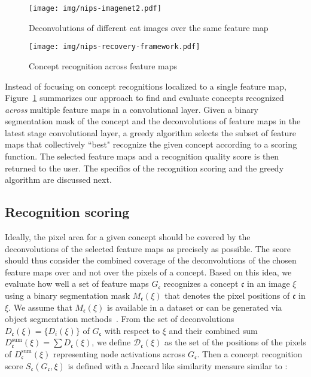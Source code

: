 \documentclass{article}
\begin{document}
\begin{figure}
\centering
\begin{minipage}{.42\textwidth}
  \centering
    \texttt{[image: img/nips-imagenet2.pdf]}
 \caption{Deconvolutions of different cat images over the same feature map}
  \label{fig:nips-imagenet2}
\end{minipage}%
\hspace{20px}
\begin{minipage}{.52\textwidth}
  \centering
  \texttt{[image: img/nips-recovery-framework.pdf]}
\caption{Concept recognition across feature maps}
\label{fig:nips-recovery-framework}
\end{minipage}
\end{figure}

Instead of focusing on concept recognitions localized to a single feature map, 
Figure~\ref{fig:nips-recovery-framework} summarizes our approach to find and evaluate concepts recognized
{\em across} multiple feature maps in a convolutional layer. Given a binary segmentation mask of the concept and the deconvolutions of 
feature maps in the latest stage convolutional layer, a greedy algorithm selects the subset of feature
maps that collectively ``best" recognize the given concept according to a scoring function. 
The selected feature maps and a recognition quality score is then returned to the user. 
The specifics of the recognition scoring and the greedy algorithm are discussed next.

\subsection{Recognition scoring}
\label{subsub:score}
Ideally, the pixel area for a given concept should be covered by the deconvolutions of the selected feature maps as precisely as possible. The score should thus consider the combined coverage of the 
deconvolutions of the chosen feature
maps over and not over the pixels of a concept.  Based on this idea,
we evaluate how well a set of feature maps $G_\mathfrak{c}$ recognizes a concept $\mathfrak{c}$ in an image $\xi$ 
using a binary segmentation mask $M_\mathfrak{c}(\xi)$ that denotes the pixel positions of $\mathfrak{c}$ in $\xi$.
We assume that $M_\mathfrak{c}(\xi)$ is available in a dataset or can be generated via object segmentation
methods~\citep{chen2016deeplab}. 
From the set of deconvolutions $D_\mathfrak{c}(\xi) = \{D_i(\xi)\}$ of $G_\mathfrak{c}$ with respect
to $\xi$ and their 
combined sum $D^{\text{sum}}_\mathfrak{c}(\xi) = \sum D_\mathfrak{c}(\xi)$, we define 
$\mathcal{D}_\mathfrak{c}(\xi)$ as the set of the positions of the pixels of $D^{\text{sum}}_\mathfrak{c}(\xi)$ representing node activations across $G_\mathfrak{c}$. Then a concept recognition score $S_\mathfrak{c}(G_\mathfrak{c},\xi)$
is defined with a Jaccard like similarity measure similar to \citet{bau2017network}:
\end{document}
